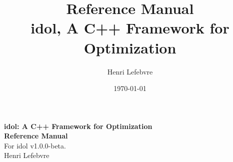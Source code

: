 \documentclass[a4paper, american, reqno]{amsbook}
\title[\textsf{idol}: A C++ Framework for Optimization]{Reference Manual\\\textsf{idol}, A C++ Framework for Optimization}
\author[H. Lefebvre]{Henri Lefebvre}
\date{\today}
\begin{document}
\begin{titlepage}

    \vspace*{7cm}

    \begin{center}
        {\huge\bfseries \textsf{idol}: A \textsf{C++} Framework for Optimization}\\[3em]
        {\LARGE\bfseries Reference Manual}\\[1em]
        
        For \textsf{idol} v1.0.0-beta.\\[2em]

        {\large Henri Lefebvre}
    \end{center}

    \vspace*{\fill}

\end{titlepage}



\printbibliography
\end{document}
